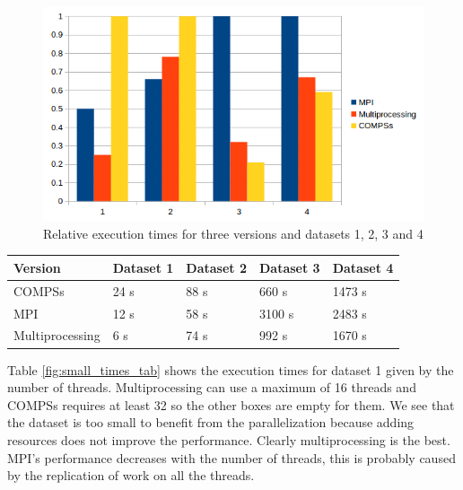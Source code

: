 \begin{figure}[h]
\centering
\includegraphics[scale=0.85]{img/graph.png}
\caption{Relative execution times for three versions and datasets 1, 2, 3 and 4}
\label{fig:graph}
\end{figure}

\begin{center}
	\begin{tabular}{| C{3cm} | C{3cm} | C{3cm} | C{3cm} | C{3cm} |}
	\hline
	Version & Dataset 1 & Dataset 2 & Dataset 3 & Dataset 4 \\ 
	\hline \hline
	COMPSs & 24 s & 88 s & 660 s & 1473 s \\
	\hline
	MPI & 12 s & 58 s & 3100 s & 2483 s \\
	\hline
	Multiprocessing & 6 s & 74 s & 992 s & 1670 s \\
	\hline
	\end{tabular}
	\label{fig:times}
\end{center}



Table \ref{fig:small_times_tab} shows the execution times for dataset 1 given by the number of threads. Multiprocessing can use a maximum of 16 threads and COMPSs requires at least 32 so the other boxes are empty for them. We see that the dataset is too small to benefit from the parallelization because adding resources does not improve the performance. Clearly multiprocessing is the best. MPI's performance decreases with the number of threads, this is probably caused by the replication of work on all the threads.



